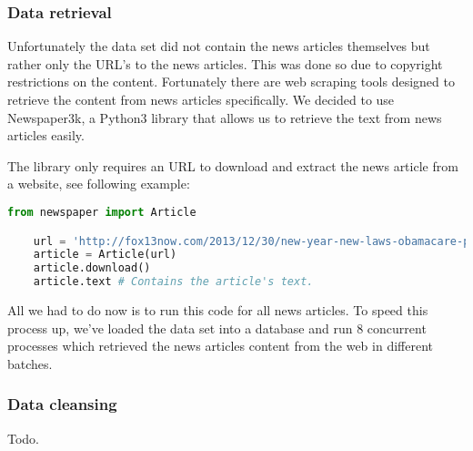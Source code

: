 \subsubsection{Data retrieval}
Unfortunately the data set did not contain the news articles themselves but rather only the URL's to the news articles.
This was done so due to copyright restrictions on the content.
Fortunately there are web scraping tools designed to retrieve the content from news articles specifically.
We decided to use Newspaper3k\cite{newspaper3k},
a Python3 library that allows us to retrieve the text from news articles easily.

The library only requires an URL to download and extract the news article from a website, see following example:

\begin{lstlisting}[language=Python, caption=Retrieve the news article from an URL., label={lst:newspaper3k_code}]
    from newspaper import Article

    url = 'http://fox13now.com/2013/12/30/new-year-new-laws-obamacare-pot-guns-and-drones/'
    article = Article(url)
    article.download()
    article.text # Contains the article's text.
\end{lstlisting}

All we had to do now is to run this code for all news articles.
To speed this process up, we've loaded the data set into a database and run 8 concurrent processes which
retrieved the news articles content from the web in different batches.

\subsubsection{Data cleansing}
Todo.



